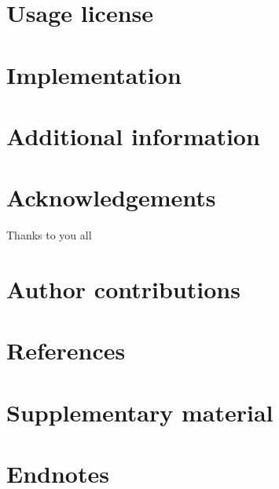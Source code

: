 \documentclass[
]{article}
\begin{document}
\hypertarget{usage-license}{%
\section{Usage license}\label{usage-license}}

\hypertarget{implementation}{%
\section{Implementation}\label{implementation}}

\hypertarget{additional-information}{%
\section{Additional information}\label{additional-information}}

\hypertarget{acknowledgements}{%
\section{Acknowledgements}\label{acknowledgements}}

Thanks to you all

\hypertarget{author-contributions}{%
\section{Author contributions}\label{author-contributions}}

\hypertarget{references}{%
\section{References}\label{references}}

\hypertarget{supplementary-material}{%
\section{Supplementary material}\label{supplementary-material}}

\hypertarget{endnotes}{%
\section*{Endnotes}\label{endnotes}}
\end{document}

